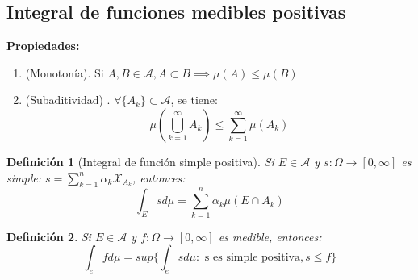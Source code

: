 \documentclass[11pt, a4paper]{article}
\theoremstyle{theorem-style}
\theoremstyle{definition-style}
\newtheorem{ndef}{Definición}[section]
\theoremstyle{remark-style}
\theoremstyle{example-style}
\newenvironment{nlist}
{\begin{enumerate}
\renewcommand\labelenumi{(\emph{\roman{enumi})}}}
{\end{enumerate}}
\begin{document}
\subsection{Integral de funciones medibles positivas}

\textbf{Propiedades:}
\begin{nlist}
	\item (Monotonía). Si $A,B \in \mathcal{A}, A \subset B \implies \mu(A) \leq \mu(B)$
	\item (Subaditividad) . $\forall \{A_k\} \subset \mathcal{A}$, se tiene:
	\[
	\mu(\bigcup_{k=1}^\infty A_k) \leq \sum_{k=1}^\infty \mu(A_k)
	\]
\end{nlist}


\begin{ndef}[Integral de función simple positiva]
	Si $E\in \mathcal{A}$ y $s:\Omega \to [0,\infty]$ es simple: $s= \sum_{k=1}^n \alpha_k \mathcal{X}_{A_k}$, entonces:
	\[
	\int_E s d\mu = \sum_{k=1}^n \alpha_k \mu(E\cap A_k)
	\]
\end{ndef}

\begin{ndef}
	Si $E\in \mathcal{A}$ y $f: \Omega \to [0,\infty]$ es medible, entonces:
	\[
	\int_e f d\mu = sup\{\int_e s d\mu: \text{ s es simple positiva}, s \leq f\}
	\]
\end{ndef}
\end{document}
